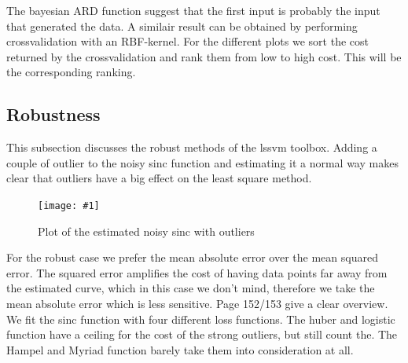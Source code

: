 \documentclass[•]{article}
\newcommand{\apicture}[2] {
  \begin{figure}[H]
  \centering
  \texttt{[image: \#1]}
  \caption{#2}
  \end{figure}
}
\begin{document}
The bayesian ARD function suggest that the first input is probably the input that generated the data. A similair result can be obtained by performing crossvalidation with an RBF-kernel. For the different plots we sort the cost returned by the crossvalidation and rank them from low to high cost. This will be the corresponding ranking.

\subsection{Robustness}
This subsection discusses the robust methods of the lssvm toolbox. Adding a couple of outlier to the noisy sinc function and estimating it a normal way makes clear that outliers have a big effect on the least square method. 

\apicture{noisysincout.jpg}{Plot of the estimated noisy sinc with outliers}

For the robust case we prefer the mean absolute error over the mean squared error. The squared error amplifies the cost of having data points far away from the estimated curve, which in this case we don't mind, therefore we take the mean absolute error which is less sensitive. Page 152/153 give a clear overview. We fit the sinc function with four different loss functions. The huber and logistic function have a ceiling for the cost of the strong outliers, but still count the. The Hampel and Myriad function barely take them into consideration at all.
\end{document}
